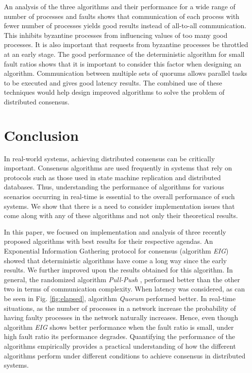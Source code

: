 An analysis of the three algorithms and their performance for a wide range of number of processes and faults shows that communication of each process with fewer number of processes yields good results instead of all-to-all communication. This inhibits byzantine processes from influencing values of too many good processes. It is also important that requests from byzantine processes be throttled at an early stage. The good performance of the deterministic algorithm for small fault ratios shows that it is important to consider this factor when designing an algorithm.  Communication between multiple sets of quorums allows parallel tasks to be executed and gives good latency results. The combined use of these techniques would help design improved algorithms to solve the problem of distributed consensus. 



\section{Conclusion}
\label{sec:conc}
In real-world systems, achieving distributed consensus can be critically important. Consensus algorithms are used frequently in systems that rely on protocols such as those used in state machine replication and distributed databases. Thus, understanding the performance of algorithms for various scenarios occurring in real-time is essential to the overall performance of such systems. We show that there is a need to consider implementation issues that come along with any of these algorithms and not only their theoretical results. 

In this paper, we focused on implementation and analysis of three recently proposed algorithms with best results for their respective agendas. An Exponential Information Gathering protocol for consensus \cite{KM13} (algorithm \textit{EIG}) showed that deterministic algorithms have come a long way since the early results. We further improved upon the results obtained for this algorithm. In general, the randomized algorithm \textit{Pull-Push} \cite{BGH13}, performed better than the other two in terms of communication complexity. When latency was considered, as can be seen in Fig. \ref{fig:elapsed}, algorithm \textit{Quorum} \cite{BPV06} performed better. In real-time situations, as the number of processes in a network increase the probability of having faulty processes in the network naturally increases. Hence, even though algorithm \textit{EIG} shows better performance when the fault ratio is small, under high fault ratio its performance degrades. Quantifying the performance of the algorithms empirically provides a
practical understanding of how the different algorithms perform under
different conditions to achieve consensus in distributed systems.


